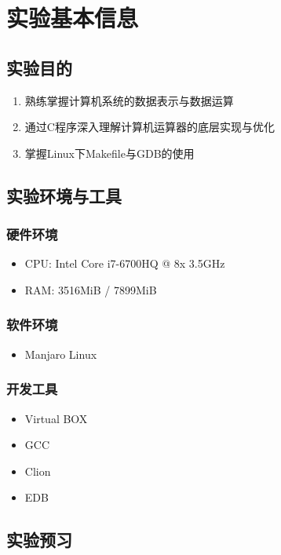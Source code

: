 \section{实验基本信息}

\subsection{实验目的}
\begin{enumerate}
    \item 熟练掌握计算机系统的数据表示与数据运算
    \item 通过C程序深入理解计算机运算器的底层实现与优化
    \item 掌握Linux下Makefile与GDB的使用
\end{enumerate}

\subsection{实验环境与工具}

\subsubsection{硬件环境}
\begin{itemize}
    \item CPU: Intel Core i7-6700HQ @ 8x 3.5GHz
    \item RAM: 3516MiB / 7899MiB
\end{itemize}

\subsubsection{软件环境}
\begin{itemize}
    \item Manjaro Linux

\end{itemize}

\subsubsection{开发工具}
\begin{itemize}
    \item Virtual BOX
    \item GCC
    \item Clion
    \item EDB
\end{itemize}

\subsection{实验预习}
\inputminted{c}{src/Sample.c}